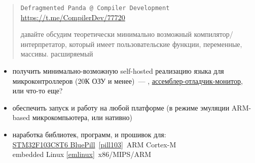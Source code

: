 \clearpage
{}\label{embed}\secdown
\clearpage

\begin{quotation}
\noindent
\verb|Defragmented Panda @ Compiler Development|\\
\url{https://t.me/CompilerDev/77720}
    
\noindent
давайте обсудим теоретически минимально возможный компилятор/интерпретатор,
который имеет пользовательские функции, переменные, массивы. расширяемый
\end{quotation}

\begin{itemize}
    \item получить минимально-возможную self-hosted реализацию языка для
    микроконтроллеров (20К ОЗУ и менее)\ --- \F,
    \href{http://www.danbigras.ru/RK86/Programm/SoftWare.html}{ассемблер-отладчик-монитор},
    или что-то еще?
    \item обеспечить запуск и работу на любой платформе (в режиме эмуляции
    ARM-based микрокомпьютера, или нативно)
    \item наработка библиотек, программ, и прошивок для:\\
    \href{https://aliexpress.ru/item/32581820854.html}{STM32F103C8T6 BluePill}\ \ref{pill103}\ ARM Cortex-M\\
    embedded Linux \ref{emlinux}\ x86/MIPS/ARM
\end{itemize}









\secup
